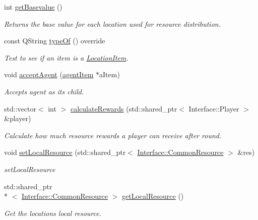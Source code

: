 \begin{DoxyCompactItemize}
int \hyperlink{class_location_item_afcb08ce61dd7334ce4f02fff8ae863fc}{get\-Basevalue} ()
\begin{DoxyCompactList}\small\item\em Returns the base value for each location used for resource distribution. \end{DoxyCompactList}\item 
const Q\-String \hyperlink{class_location_item_aee0b13a778813517b94fde896eb8183a}{type\-Of} () override
\begin{DoxyCompactList}\small\item\em Test to see if an item is a \hyperlink{class_location_item}{Location\-Item}. \end{DoxyCompactList}\item 
void \hyperlink{class_location_item_a1b7917cc5b87af2062ef60ece7c935ee}{accept\-Agent} (\hyperlink{classagent_item}{agent\-Item} $\ast$a\-Item)
\begin{DoxyCompactList}\small\item\em Accepts agent as its child. \end{DoxyCompactList}\item 
std\-::vector$<$ int $>$ \hyperlink{class_location_item_a7937ae3d8c33057583b0c1c38127a685}{calculate\-Rewards} (std\-::shared\-\_\-ptr$<$ Interface\-::\-Player $>$ \&player)
\begin{DoxyCompactList}\small\item\em Calculate how much resource rewards a player can receive after round. \end{DoxyCompactList}\item 
void \hyperlink{class_location_item_ad6b0c5f25ed3fc2e08f74ce537468c2d}{set\-Local\-Resource} (std\-::shared\-\_\-ptr$<$ \hyperlink{class_interface_1_1_common_resource}{Interface\-::\-Common\-Resource} $>$ \&res)
\begin{DoxyCompactList}\small\item\em set\-Local\-Resource \end{DoxyCompactList}\item 
std\-::shared\-\_\-ptr\\*
$<$ \hyperlink{class_interface_1_1_common_resource}{Interface\-::\-Common\-Resource} $>$ \hyperlink{class_location_item_a1d3330454656a31510843bfa8c2ac969}{get\-Local\-Resource} ()
\begin{DoxyCompactList}\small\item\em Get the locations local resource. \end{DoxyCompactList}\item 

\end{DoxyCompactItemize}
